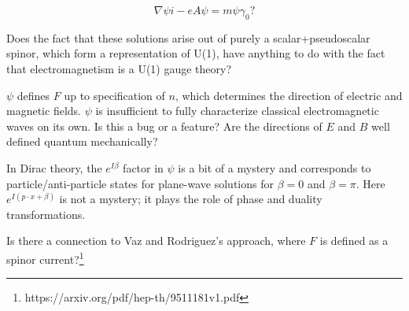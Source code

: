 \documentclass{article}
\begin{document}
  \begin{equation}
    \nabla \psi i - e A \psi = m \psi \gamma_0?
  \end{equation}
  
  Does the fact that these solutions arise out of purely a scalar+pseudoscalar spinor, which form a representation of U(1), have anything to do with the fact that electromagnetism is a U(1) gauge theory?
  
  $\psi$ defines $F$ up to specification of $n$, which determines the direction of electric and magnetic fields. $\psi$ is insufficient to fully characterize classical electromagnetic waves on its own. Is this a bug or a feature? Are the directions of $E$ and $B$ well defined quantum mechanically?
  
  In Dirac theory, the $e^{I \beta}$ factor in $\psi$ is a bit of a mystery and corresponds to particle/anti-particle states for plane-wave solutions for $\beta = 0$ and $\beta = \pi$. Here $e^{I (p \cdot x + \beta)}$ is not a mystery; it plays the role of phase and duality transformations.
  
  Is there a connection to Vaz and Rodriguez's approach, where $F$ is defined as a spinor current?\footnote{https://arxiv.org/pdf/hep-th/9511181v1.pdf}
\end{document}

